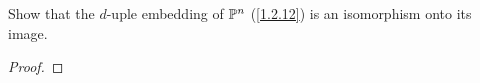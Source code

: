 \label{1.3.4}

Show that the $d$-uple embedding of $\P^n$ (\ref{1.2.12}) is an isomorphism onto its image.

\begin{proof}

\end{proof}
